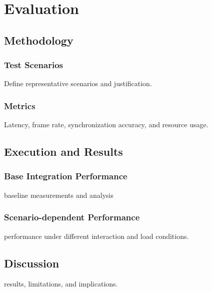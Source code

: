 \chapter{Evaluation} \label{chap:evaluation}

\section{Methodology}
\subsection{Test Scenarios}
Define representative scenarios and justification.

\subsection{Metrics}
Latency, frame rate, synchronization accuracy, and resource usage.

\section{Execution and Results}
\subsection{Base Integration Performance}
baseline measurements and analysis

\subsection{Scenario-dependent Performance}
performance under different interaction and load conditions.

\section{Discussion}
results, limitations, and implications.
